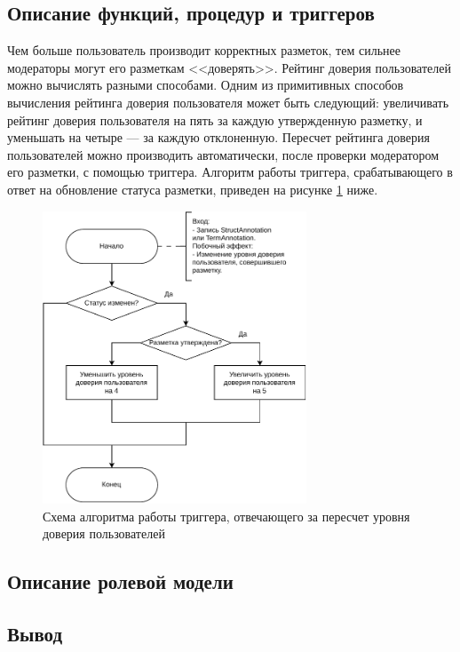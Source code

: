 \subsection{Описание функций, процедур и триггеров}

Чем больше пользователь производит корректных разметок, тем сильнее модераторы могут его разметкам <<доверять>>.
Рейтинг доверия пользователей можно вычислять разными способами.
Одним из примитивных способов вычисления рейтинга доверия пользователя может быть следующий: увеличивать рейтинг доверия пользователя на пять за каждую утвержденную разметку, и уменьшать на четыре --- за каждую отклоненную.
Пересчет рейтинга доверия пользователей можно производить автоматически, после проверки модератором его разметки, с помощью триггера.
Алгоритм работы триггера, срабатывающего в ответ на обновление статуса разметки, приведен на рисунке \ref{fig:trig} ниже.

\begin{figure}[H]
	\centering
	\includegraphics[width=0.7\textwidth]{diag/trig-v3.pdf}
	\caption{Схема алгоритма работы триггера, отвечающего за пересчет уровня доверия пользователей}
	\label{fig:trig}
\end{figure}

\subsection{Описание ролевой модели}

\subsection{Вывод}

